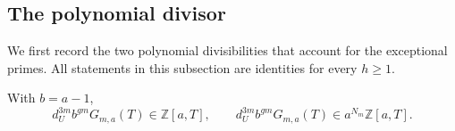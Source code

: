 \subsection{The polynomial divisor}

We first record the two polynomial divisibilities that account for the
exceptional primes.  All statements in this subsection are identities for
every $h\ge1$.

\begin{lemma}[formal divisor at $a=0$]\label{lem:p0-a-divisor}
With $b=a-1$,
\begin{equation}\label{eq:p0-denom}
 d_U^{3m}b^{gm}G_{m,a}(T)\in\mathbb Z[a,T],
 \qquad
 d_U^{3m}b^{gm}G_{m,a}(T)\in a^{N_m}\mathbb Z[a,T].
\end{equation}
\end{lemma}


